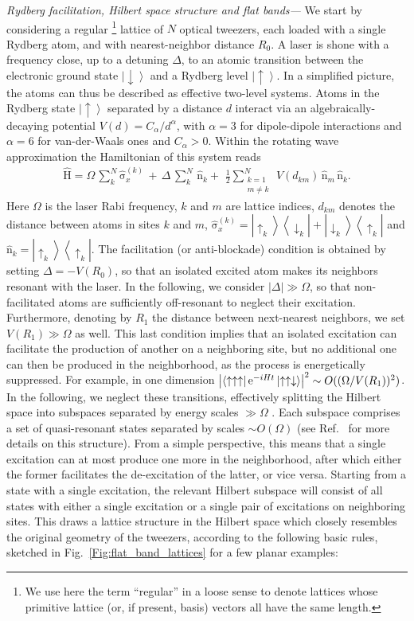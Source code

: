 \documentclass[prl,aps,twocolumn,showpacs,superscriptaddress,longbibliography]{revtex4-1}
\newcommand{\rme}[1]{{\rm{e}}^{#1}}
\newcommand{\lan}{\left\langle}
\newcommand{\ran}{\right\rangle}
\newcommand{\abs}[1]{\left| #1 \right|}
\newcommand{\ket}[1]{\left| #1 \ran}
\newcommand{\bra}[1]{\lan #1 \right|}
\newcommand{\proj}[1]{\ket{#1} \bra{#1}}
\newcommand{\up}{\uparrow}
\newcommand{\down}{\downarrow}
\newcommand{\op}[1]{\mathrm{\hat{#1}}}
\begin{document}
\emph{Rydberg facilitation, Hilbert space structure and flat bands---} We start by considering a regular \footnote{We use here the term ``regular'' in a loose sense to denote lattices whose primitive lattice (or, if present, basis) vectors all have the same length.} lattice of $N$ optical tweezers, each loaded with a single Rydberg atom, and with nearest-neighbor distance $R_0$. A laser is shone with a frequency close, up to a detuning $\Delta$, to an atomic transition between the electronic ground state $\ket{\down}$ and a Rydberg level $\ket{\up}$. In a simplified picture, the atoms can thus be described as effective two-level systems. Atoms in the Rydberg state $\ket{\up}$ separated by a distance $d$ interact via an algebraically-decaying potential $V(d) = C_\alpha / d^\alpha$, with $\alpha = 3$ for dipole-dipole interactions and $\alpha = 6$ for van-der-Waals ones and $C_\alpha > 0$. Within the rotating wave approximation the Hamiltonian of this system reads
%
\begin{align}
 \op{H} = \Omega \, \sum_k^N  \op{\sigma}_x^{(k)} \, + \, \Delta\, \sum_k^N\,\op{n}_k +\,  \,
\frac{1}{2} \sum_{\substack{k= 1\\ m \ne k}}^N \, V(d_{km}) \, \op{n}_m\, \op{n}_k.
 \label{Eq:Hamil_full}
\end{align}
%
Here $\Omega$ is the laser Rabi frequency, $k$ and $m$ are lattice indices, $d_{km}$ denotes the distance between atoms in sites $k$ and $m$, $\op{\sigma}_x^{(k)} = \ket{\up_k} \bra{\down_k} + \ket{\down_k} \bra{\up_k}$ and $\op{n}_k = \proj{\up_k}$. The facilitation (or anti-blockade) condition is obtained by setting $\Delta = -V(R_0)$, so that an isolated excited atom makes its neighbors resonant with the laser. In the following, we consider $\abs{\Delta} \gg \Omega$, so that non-facilitated atoms are sufficiently off-resonant to neglect their excitation. Furthermore, denoting by $R_1$ the distance between next-nearest neighbors, we set $V(R_1) \gg \Omega$ as well. This last condition implies that an isolated excitation can facilitate the production of another on a neighboring site, but no additional one can then be produced in the neighborhood, as the process is energetically suppressed. For example, in one dimension $\abs{\bra{\up \up \up} \rme{-iHt} \ket{\up \up \down}}^2 \sim O((\Omega / V(R_1))^2)$. In the following, we neglect these transitions, effectively splitting the Hilbert space into subspaces separated by energy scales $\gg \Omega$ . Each subspace comprises a set of quasi-resonant states separated by scales $\sim O(\Omega)$ (see Ref.~\cite{a_Marcuzzi_PRL_17} for more details on this structure). From a simple perspective, this means that a single excitation can at most produce one more in the neighborhood, after which either the former facilitates the de-excitation of the latter, or vice versa. Starting from a state with a single excitation, the relevant Hilbert subspace will consist of all states with either a single excitation or a single pair of excitations on neighboring sites. This draws a lattice structure in the Hilbert space which closely resembles the original geometry of the tweezers, according to the following basic rules, sketched in Fig.~\ref{Fig:flat_band_lattices} for a few planar examples:
\end{document}
